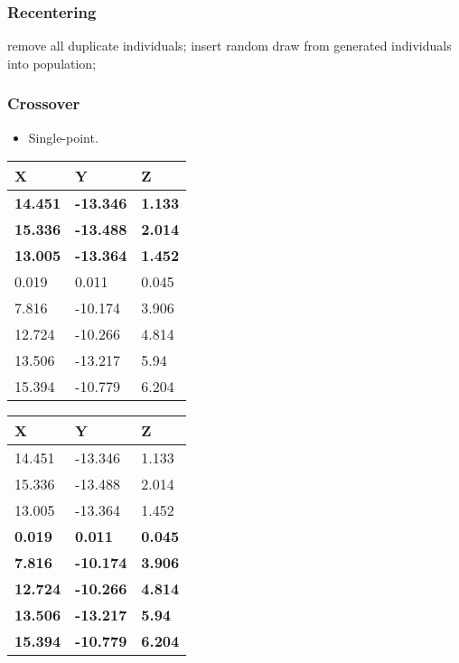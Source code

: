 \documentclass[]{beamer}
\begin{document}
\begin{frame}
  \frametitle{Recentering}

  \begin{algorithmic}

    \STATE remove all duplicate individuals;
      \STATE insert random draw from generated individuals into population;
    \ENDWHILE
  \ENDIF

  \end{algorithmic}

\end{frame}

\begin{frame}
  \frametitle{Crossover}

  \begin{itemize}
    \item Single-point.
  \end{itemize}

  \begin{table}[htp]
  \begin{tabular}{ | l | l | l |}
    \hline
      X & Y & Z \\ \hline
      \bf14.451 & \bf-13.346 & \bf1.133 \\ \hline
      \bf15.336 & \bf-13.488 & \bf2.014 \\ \hline
      \bf13.005 & \bf-13.364 & \bf1.452 \\ \hline
      0.019 & 0.011 & 0.045 \\ \hline
      7.816 & -10.174 & 3.906 \\ \hline
      12.724 & -10.266 & 4.814 \\ \hline
      13.506 & -13.217 & 5.94 \\ \hline
      15.394 & -10.779 & 6.204 \\ \hline
  \end{tabular}
  \begin{tabular}{ | l | l | l |}
    \hline
      X & Y & Z \\ \hline
      14.451 & -13.346 & 1.133 \\ \hline
      15.336 & -13.488 & 2.014 \\ \hline
      13.005 & -13.364 & 1.452 \\ \hline
      \bf0.019 & \bf0.011 & \bf0.045 \\ \hline
      \bf7.816 & \bf-10.174 & \bf3.906 \\ \hline
      \bf12.724 & \bf-10.266 & \bf4.814 \\ \hline
      \bf13.506 & \bf-13.217 & \bf5.94 \\ \hline
      \bf15.394 & \bf-10.779 & \bf6.204 \\ \hline
  \end{tabular}
  \end{table}

\end{frame}
\end{document}
